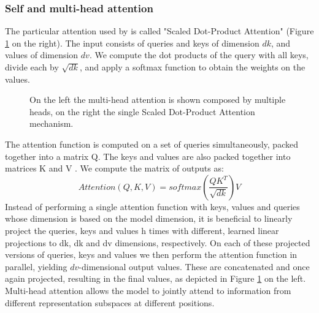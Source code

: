 \subsubsection{Self and multi-head attention}
The particular attention used by \cite{vaswani2017attention} is called "Scaled Dot-Product Attention" (Figure \ref{fig:transformer_attention} on the right). The input consists of queries and keys of dimension $dk$, and values of dimension $dv$. We compute the dot products of the query with all keys, divide each by $\sqrt{dk}$, and apply a softmax function to obtain the weights on the values.
\begin{figure}[H]%
    \centering
    \caption{On the left the multi-head attention is shown composed by multiple heads, on the right the single Scaled Dot-Product Attention mechanism.}
    \label{fig:transformer_attention}%
\end{figure}
The attention function is computed on a set of queries simultaneously, packed together into a matrix Q. The keys and values are also packed together into matrices K and V . We compute the matrix of outputs as:
$$Attention(Q, K, V ) = softmax(\frac{QK^T}{\sqrt{dk}})V$$
Instead of performing a single attention function with keys, values and queries whose dimension is based on the model dimension, it is beneficial to linearly project the queries, keys and values h times with different, learned linear projections to dk, dk and dv dimensions, respectively. On each of these projected versions of queries, keys and values we then perform the attention function in parallel, yielding $dv$-dimensional output values. These are concatenated and once again projected, resulting in the final values, as depicted in Figure \ref{fig:transformer_attention} on the left.
Multi-head attention allows the model to jointly attend to information from different representation subspaces at different positions.

